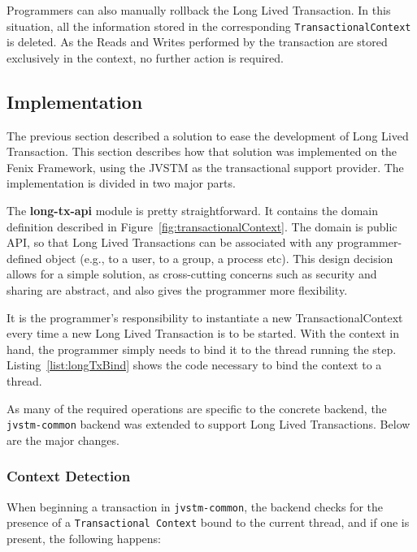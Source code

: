\documentclass{llncs}
\begin{document}
Programmers can also manually rollback the Long Lived Transaction. In
this situation, all the information stored in the corresponding
\texttt{TransactionalContext} is deleted. As the Reads and Writes
performed by the transaction are stored exclusively in the context, no
further action is required.

\subsection{Implementation}
\label{sec:impl}


The previous section described a solution to ease the development of
Long Lived Transaction. This section describes how that solution was
implemented on the Fenix Framework, using the JVSTM as the
transactional support provider. The implementation is divided in two
major parts.

The {\bf long-tx-api} module is pretty straightforward. It contains
the domain definition described in
Figure~\ref{fig:transactionalContext}. The domain is public API, so
that Long Lived Transactions can be associated with any
programmer-defined object (e.g., to a user, to a group, a process
etc). This design decision allows for a simple solution, as
cross-cutting concerns such as security and sharing are abstract, and
also gives the programmer more flexibility.

It is the programmer's responsibility to instantiate a new
TransactionalContext every time a new Long Lived Transaction is to be
started. With the context in hand, the programmer simply needs to bind
it to the thread running the step. Listing~\ref{list:longTxBind} shows
the code necessary to bind the context to a thread.

As many of the required operations are specific to the concrete
backend, the \texttt{jvstm-common} backend was extended to support
Long Lived Transactions. Below are the major changes.

\subsubsection{Context Detection}

When beginning a transaction in \texttt{jvstm-common}, the backend
checks for the presence of a \texttt{Transactional Context} bound to
the current thread, and if one is present, the following happens:
\end{document}
